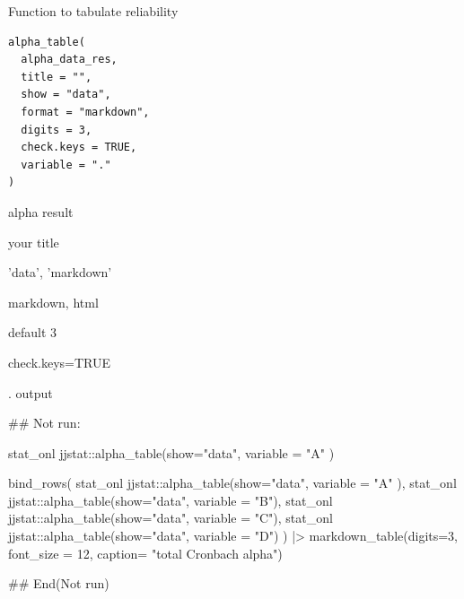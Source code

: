 \documentclass[a4paper]{book}
\begin{document}
%
\begin{Description}
Function to tabulate reliability
\end{Description}
%
\begin{Usage}
\begin{verbatim}
alpha_table(
  alpha_data_res,
  title = "",
  show = "data",
  format = "markdown",
  digits = 3,
  check.keys = TRUE,
  variable = "."
)
\end{verbatim}
\end{Usage}
%
\begin{Arguments}
\begin{ldescription}
\item[\code{alpha\_data\_res}] alpha result

\item[\code{title}] your title

\item[\code{show}] 'data', 'markdown'

\item[\code{format}] markdown, html

\item[\code{digits}] default 3

\item[\code{check.keys}] check.keys=TRUE

\item[\code{variable}] . output
\end{ldescription}
\end{Arguments}
%
\begin{Examples}
\begin{ExampleCode}
\#\# Not run: 

stat_onl %
   jjstat::alpha_table(show="data", variable = "A" )


bind_rows(
 stat_onl %
   jjstat::alpha_table(show="data", variable = "A" ),
 stat_onl %
   jjstat::alpha_table(show="data", variable = "B"),
 stat_onl %
   jjstat::alpha_table(show="data", variable = "C"),
 stat_onl %
   jjstat::alpha_table(show="data", variable = "D")
) |> markdown_table(digits=3, font_size = 12,
                   caption= "total Cronbach alpha")

## End(Not run)




\end{ExampleCode}
\end{Examples}
\end{document}
